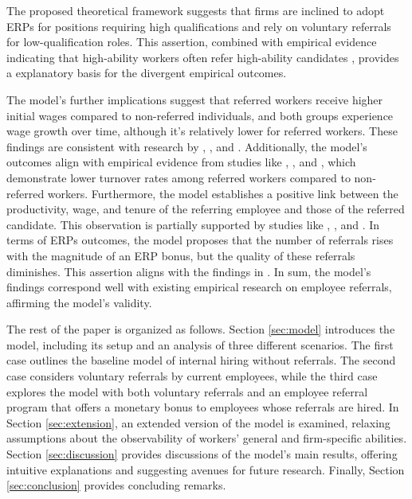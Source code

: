 \documentclass[12pt]{article}
\begin{document}
The proposed theoretical framework suggests that firms are inclined to adopt ERPs for positions requiring high qualifications and rely on voluntary referrals for low-qualification roles. This assertion, combined with empirical evidence indicating that high-ability workers often refer high-ability candidates \citep{montgomery1992job}, provides a explanatory basis for the divergent empirical outcomes.

The model's further implications suggest that referred workers receive higher initial wages compared to non-referred individuals, and both groups experience wage growth over time, although it's relatively lower for referred workers. These findings are consistent with research by \cite{corcoran1980most}, \cite{montgomery1991social}, and \cite{dustmann2016referral}. Additionally, the model's outcomes align with empirical evidence from studies like \cite{pallais2016referential}, \cite{lalanne2016old}, and \cite{lalanne2021social}, which demonstrate lower turnover rates among referred workers compared to non-referred workers. Furthermore, the model establishes a positive link between the productivity, wage, and tenure of the referring employee and those of the referred candidate. This observation is partially supported by studies like \cite{kugler2003employee}, \cite{lalanne2016old}, and \cite{levati2020impact}. In terms of ERPs outcomes, the model proposes that the number of referrals rises with the magnitude of an ERP bonus, but the quality of these referrals diminishes. This assertion aligns with the findings in \cite{friebel2023employee}. In sum, the model's findings correspond well with existing empirical research on employee referrals, affirming the model's validity.

The rest of the paper is organized as follows. Section \ref{sec:model} introduces the model, including its setup and an analysis of three different scenarios. The first case outlines the baseline model of internal hiring without referrals. The second case considers voluntary referrals by current employees, while the third case explores the model with both voluntary referrals and an employee referral program that offers a monetary bonus to employees whose referrals are hired. In Section \ref{sec:extension}, an extended version of the model is examined, relaxing assumptions about the observability of workers' general and firm-specific abilities. Section \ref{sec:discussion} provides discussions of the model's main results, offering intuitive explanations and suggesting avenues for future research. Finally, Section \ref{sec:conclusion} provides concluding remarks.
\end{document}

